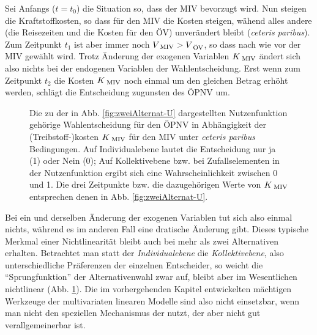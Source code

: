 Sei Anfangs ($t=t_0$) die Situation so, dass der MIV bevorzugt
wird. Nun steigen die Kraftstoffkosten, so dass f\"ur den MIV die
Kosten steigen, w\"ahend alles andere (die Reisezeiten und die Kosten
f\"ur den \"OV) unver\"andert bleibt
(\textit{ceteris paribus}). Zum Zeitpunkt $t_1$ ist aber immer noch
$V_{{\mbox{ {\scriptsize \hspace{-0.2ex}MIV}}}}>V_{{\mbox{ {\scriptsize \hspace{-0.2ex}\"OV}}}}$, so dass nach wie vor der MIV gew\"ahlt
wird. Trotz \"Anderung der exogenen Variablen $K_{{\mbox{ {\scriptsize \hspace{-0.2ex}MIV}}}}$ \"andert
sich also nichts bei der endogenen Variablen der
Wahlentscheidung. Erst wenn zum Zeitpunkt $t_2$ die Kosten
$K_{{\mbox{ {\scriptsize \hspace{-0.2ex}MIV}}}}$ noch einmal um den gleichen Betrag erh\"oht werden,
schl\"agt die Entscheidung zugunsten des \"OPNV um. 


\begin{figure}[t!]
\caption{\label{fig:zweiAlternat-P}Die zu der in
Abb. \protect\ref{fig:zweiAlternat-U} dargestellten Nutzenfunktion
geh\"orige Wahlentscheidung f\"ur den \"OPNV
in Abh\"angigkeit der (Treibstoff-)kosten $K_{{\mbox{ {\scriptsize \hspace{-0.2ex}MIV}}}}$ f\"ur den MIV
unter \textit{ceteris paribus} Bedingungen. Auf Individualebene lautet
die Entscheidung nur ja (1) oder Nein (0); Auf Kollektivebene bzw. bei
Zufallselementen in der Nutzenfunktion ergibt sich eine
Wahrscheinlichkeit zwischen 0 und 1. Die drei Zeitpunkte bzw. die
dazugeh\"origen Werte von $K_{{\mbox{ {\scriptsize \hspace{-0.2ex}MIV}}}}$ entsprechen
denen in Abb.  \protect\ref{fig:zweiAlternat-U}.
}
\end{figure}

Bei ein und
derselben \"Anderung der exogenen Variablen tut sich also einmal
nichts, w\"ahrend es im anderen Fall eine dratische \"Anderung
gibt. Dieses typische Merkmal einer Nichtlinearit\"at bleibt auch bei
mehr als zwei Alternativen erhalten. Betrachtet man statt der
\textit{Individualebene} die \textit{Kollektivebene}, also
unterschiedliche Pr\"aferenzen der einzelnen Entscheider, so weicht
die ``Sprungfunktion'' der Alternativenwahl zwar 
auf, bleibt aber im Wesentlichen nichtlinear
(Abb. \ref{fig:zweiAlternat-P}). Die im vorhergehenden Kapitel
entwickelten m\"achtigen Werkzeuge der multivariaten linearen Modelle
sind also nicht einsetzbar, wenn man nicht den speziellen Mechanismus
der  nutzt, der aber nicht gut
verallgemeinerbar ist. 



